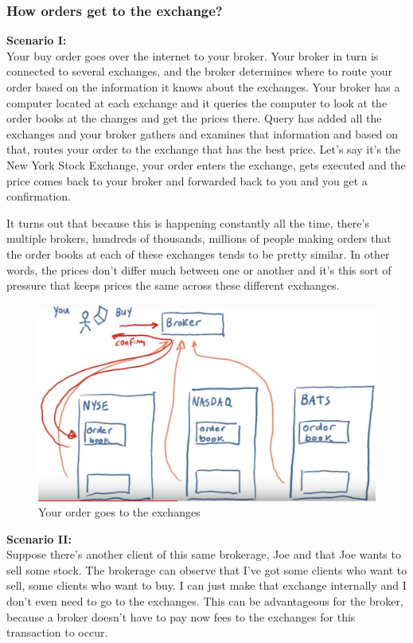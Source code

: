 \documentclass[12pt]{article}
\begin{document}
\subsubsection{How orders get to the exchange?}

\noindent
\textbf{Scenario I:} \\
Your buy order goes over the internet to your broker. Your broker in turn is connected to several exchanges, and the broker determines where to route your order based on the information it knows about the exchanges. Your broker has a computer located at each exchange and it queries the computer to look at the order books at the changes and get the prices there. Query has added all the exchanges and your broker gathers and examines that information and based on that, routes your order to the exchange that has the best price. Let's say it's the New York Stock Exchange, your order enters the exchange, gets executed and the price comes back to your broker and forwarded back to you and you get a confirmation. 

It turns out that because this is happening constantly all the time, there's multiple brokers, hundreds of thousands, millions of people making orders that the order books at each of these exchanges tends to be pretty similar. In other words, the prices don't differ much between one or another and it's this sort of pressure that keeps prices the same across these different exchanges. 

\begin{figure}[!ht]
\centering
\includegraphics[scale=0.3]{fig/fig28}
\caption{Your order goes to the exchanges}
\end{figure}

\noindent
\textbf{Scenario II:} \\
Suppose there's another client of this same brokerage, Joe and that Joe wants to sell some stock. The brokerage can observe that I've got some clients who want to sell, some clients who want to buy. I can just make that exchange internally and I don't even need to go to the exchanges. This can be advantageous for the broker, because a broker doesn't have to pay now fees to the exchanges for this transaction to occur. 
\end{document}
